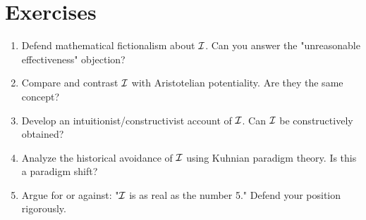 \section{Exercises}

\begin{enumerate}
    \item Defend mathematical fictionalism about $\mathcal{I}$. Can you answer the "unreasonable effectiveness" objection?
    
    \item Compare and contrast $\mathcal{I}$ with Aristotelian potentiality. Are they the same concept?
    
    \item Develop an intuitionist/constructivist account of $\mathcal{I}$. Can $\mathcal{I}$ be constructively obtained?
    
    \item Analyze the historical avoidance of $\mathcal{I}$ using Kuhnian paradigm theory. Is this a paradigm shift?
    
    \item Argue for or against: "$\mathcal{I}$ is as real as the number 5." Defend your position rigorously.
\end{enumerate}

